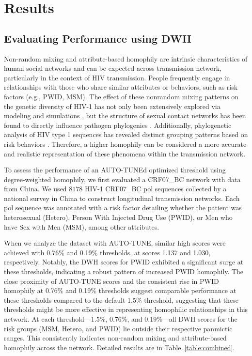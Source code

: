 \documentclass[utf8]{FrontiersinHarvard} %
\begin{document}
\section{Results}

\subsection{Evaluating Performance using DWH}

Non-random mixing and attribute-based homophily are intrinsic characteristics
of human social networks and can be expected across transmission network,
particularly in the context of HIV transmission. People frequently engage in
relationships with those who share similar attributes or behaviors, such as
risk factors (e.g., PWID, MSM). The effect of these nonrandom mixing patterns
on the genetic diversity of HIV-1 has not only been extensively explored via
modeling and simulations \citep{goodreau_assessing_2006}, but the structure of
sexual contact networks has been found to directly influence pathogen
phylogenies \citep{robinson_how_2013}. Additionally, phylogenetic analysis of
HIV type 1 sequences has revealed distinct grouping patterns based on risk
behaviors \citep{holmes_molecular_1995}. Therefore, a higher homophily can be
considered a more accurate and realistic representation of these phenomena
within the transmission network.

To assess the performance of an AUTO-TUNEd optimized threshold using
degree-weighted homophily, we first evaluated a CRF07\_BC network with data
from China. We used $8178$ HIV-1 CRF07\_BC pol sequences collected by a
national survey in China to construct longitudinal transmission networks. Each
pol sequence was annotated with a risk factor detailing whether the patient was
heterosexual (Hetero), Person With Injected Drug Use (PWID), or Men who have
Sex with Men (MSM), among other attributes. 

When we analyze the dataset with AUTO-TUNE, similar high scores were achieved
with 0.76\% and 0.19\% thresholds, at scores 1.137 and 1.030, respectively.
Notably, the DWH scores for PWID exhibited a significant surge at these
thresholds, indicating a robust pattern of increased PWID homophily. The close
proximity of AUTO-TUNE scores and the consistent rise in PWID homophily at
0.76\% and 0.19\% thresholds suggest comparable performance at these thresholds
compared to the default 1.5\% threshold, suggesting that these thresholds might
be more effective in representing homophilic relationships in this network. At
each threshold—1.5\%, 0.76\%, and 0.19\%—all DWH scores for the risk groups
(MSM, Hetero, and PWID) lie outside their respective panmictic ranges. This
consistently indicates non-random mixing and attribute-based homophily across
the network. Detailed results are in Table~\ref{table:combined}. 
\end{document}
